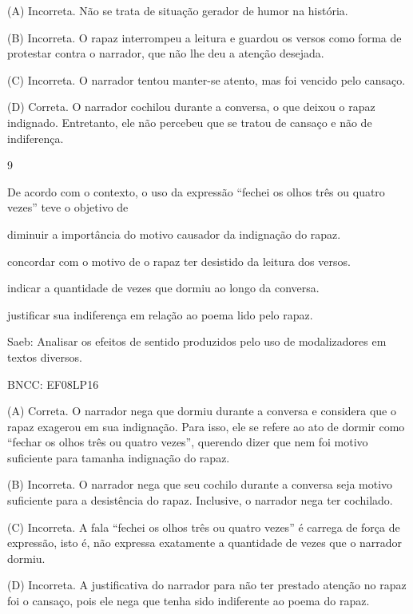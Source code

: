 (A) Incorreta. Não se trata de situação gerador de humor na história.

(B) Incorreta. O rapaz interrompeu a leitura e guardou os versos como
forma de protestar contra o narrador, que não lhe deu a atenção
desejada.

(C) Incorreta. O narrador tentou manter-se atento, mas foi vencido pelo
cansaço.

(D) Correta. O narrador cochilou durante a conversa, o que deixou o
rapaz indignado. Entretanto, ele não percebeu que se tratou de cansaço e
não de indiferença.

\num{9}

De acordo com o contexto, o uso da expressão ``fechei os olhos três ou
quatro vezes'' teve o objetivo de

\begin{escolha}
\item diminuir a importância do motivo causador da indignação do rapaz.

\item concordar com o motivo de o rapaz ter desistido da leitura dos
versos.

\item indicar a quantidade de vezes que dormiu ao longo da conversa.

\item justificar sua indiferença em relação ao poema lido pelo rapaz.
\end{escolha}

Saeb: Analisar os efeitos de sentido produzidos pelo uso de
modalizadores em textos diversos.

BNCC: EF08LP16

(A) Correta. O narrador nega que dormiu durante a conversa e considera
que o rapaz exagerou em sua indignação. Para isso, ele se refere ao ato
de dormir como ``fechar os olhos três ou quatro vezes'', querendo dizer
que nem foi motivo suficiente para tamanha indignação do rapaz.

(B) Incorreta. O narrador nega que seu cochilo durante a conversa seja
motivo suficiente para a desistência do rapaz. Inclusive, o narrador
nega ter cochilado.

(C) Incorreta. A fala ``fechei os olhos três ou quatro vezes'' é carrega
de força de expressão, isto é, não expressa exatamente a quantidade de
vezes que o narrador dormiu.

(D) Incorreta. A justificativa do narrador para não ter prestado atenção
no rapaz foi o cansaço, pois ele nega que tenha sido indiferente ao
poema do rapaz.

